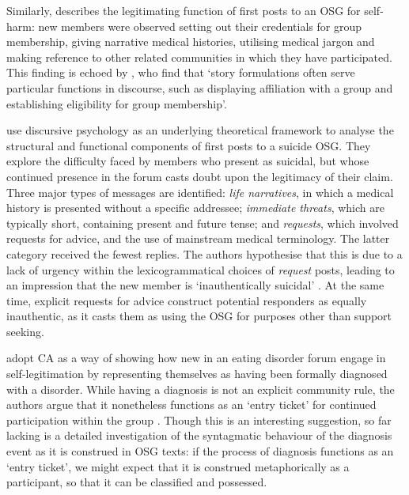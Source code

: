 Similarly, \textcite{smithson_membership_2011} describes the legitimating function of first \glspl{post} to an \gls{OSG} for self\hyp{}harm: new \glspl{member} were observed setting out their credentials for group membership, giving narrative medical histories, utilising medical jargon and making reference to other related communities in which they have participated. This finding is echoed by \textcite[p.~5]{varga2014grieving}, who find that `story formulations often serve particular functions in discourse, such as displaying affiliation with a group and establishing eligibility for group membership'.

\textcite[p.~173]{horne_doing_2009} use discursive psychology as an underlying theoretical framework to analyse the structural and functional components of first \glspl{post} to a suicide \gls{OSG}. They explore the difficulty faced by \glspl{member} who present as suicidal, but whose continued presence in the \gls{forum} casts doubt upon the legitimacy of their claim. Three major types of messages are identified: \emph{life narratives}, in which a medical history is presented without a specific addressee; \emph{immediate threats}, which are typically short, containing present and future tense; and \emph{requests}, which involved requests for advice, and the use of mainstream medical terminology. The latter category received the fewest replies. The authors hypothesise that this is due to a lack of urgency within the lexicogrammatical choices of \emph{request} \glspl{post}, leading to an impression that the new \gls{member} is `inauthentically suicidal' \parencite*[p.~180]{horne_doing_2009}. At the same time, explicit requests for advice construct potential responders as equally inauthentic, as it casts them as using the \gls{OSG} for purposes other than support seeking. 

\textcite{stommel_use_2011} adopt \gls{CA} as a way of showing how new  in an eating disorder \gls{forum} engage in self\hyp{}legitimation by representing themselves as having been formally diagnosed with a disorder. While having a diagnosis is not an explicit community rule, the authors argue that it nonetheless functions as an `entry ticket' for continued participation within the group \parencite*[p.~6]{stommel_use_2011}. Though this is an interesting suggestion, so far lacking is a detailed investigation of the syntagmatic behaviour of the diagnosis event as it is construed in \gls{OSG} texts: if the process of diagnosis functions as an `entry ticket', we might expect that it is construed metaphorically as a participant, so that it can be classified and possessed.

